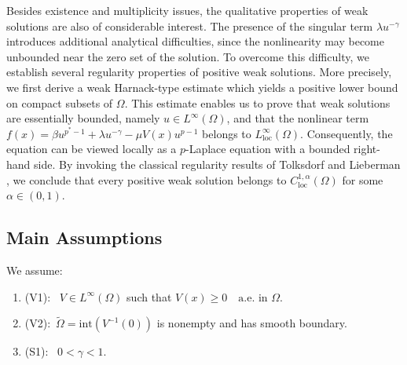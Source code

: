 \documentclass[12pt]{extarticle}
\newtheorem{theorem}{Theorem}[section]
\theoremstyle{definition}
\theoremstyle{remark}
\theoremstyle{definition}
\numberwithin{equation}{section}
\numberwithin{equation}{section}
\begin{document}
	Besides existence and multiplicity issues, the qualitative properties of weak solutions are also of considerable interest. The presence of the singular term $\lambda u^{-\gamma}$ introduces additional analytical difficulties, since the nonlinearity may become unbounded near the zero set of the solution. To overcome this difficulty, we establish several regularity properties of positive weak solutions. More precisely, we first derive a weak Harnack-type estimate which yields a positive lower bound on compact subsets of $\Omega$. This estimate enables us to prove that weak solutions are essentially bounded, namely $u\in L^\infty(\Omega)$, and that the nonlinear term $	f(x)=\beta u^{p^*-1}+\lambda u^{-\gamma}-\mu V(x)u^{p-1}$
	belongs to $L^\infty_{\mathrm{loc}}(\Omega)$. Consequently, the equation can be viewed locally as a $p$-Laplace equation with a bounded right-hand side. By invoking the classical regularity results of Tolksdorf \cite{Tolksdorf1984} and Lieberman \cite{Lieberman1988, Lieberman1991}, we conclude that every positive weak solution belongs to $C^{1,\alpha}_{\mathrm{loc}}(\Omega)$ for some $\alpha\in(0,1)$.


\subsection{Main Assumptions}
We assume:
\begin{enumerate}
\item (V1):~ $V \in L^\infty(\Omega)$ such that $V(x) \geq 0 \quad \text{a.e. in } \Omega$.
\item (V2):~$\tilde{\Omega}=\text{int}(V^{-1}(0))$ is nonempty and has smooth boundary.
\item(S1):~ $0 < \gamma < 1$.
\end{enumerate}
%
%
%
\end{document}
